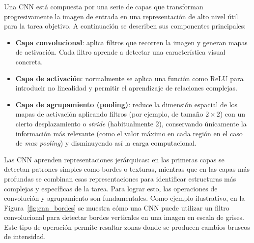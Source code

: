 \documentclass[../main.tex]{subfiles}
\begin{document}
Una CNN está compuesta por una serie de capas que transforman progresivamente la imagen de entrada en una representación de alto nivel útil para la tarea objetivo. A continuación se describen sus componentes principales:

\begin{itemize}
    \item \textbf{Capa convolucional}: aplica filtros que recorren la imagen y generan mapas de activación. Cada filtro aprende a detectar una característica visual concreta.
    \item \textbf{Capa de activación}: normalmente se aplica una función como ReLU para introducir no linealidad y permitir el aprendizaje de relaciones complejas.
    \item \textbf{Capa de agrupamiento (pooling)}: reduce la dimensión espacial de los mapas de activación aplicando filtros (por ejemplo, de tamaño $2 \times 2$) con un cierto desplazamiento o \textit{stride} (habitualmente 2), conservando únicamente la información más relevante (como el valor máximo en cada región en el caso de \textit{max pooling}) y disminuyendo así la carga computacional.
\end{itemize}


Las CNN aprenden representaciones jerárquicas: en las primeras capas se detectan patrones simples como bordes o texturas, mientras que en las capas más profundas se combinan esas representaciones para identificar estructuras más complejas y específicas de la tarea. Para lograr esto, las operaciones de convolución y agrupamiento son fundamentales. Como ejemplo ilustrativo, en la Figura~\ref{fig:cnn_bordes} se muestra cómo una CNN puede utilizar un filtro convolucional para detectar bordes verticales en una imagen en escala de grises. Este tipo de operación permite resaltar zonas donde se producen cambios bruscos de intensidad.
\end{document}
